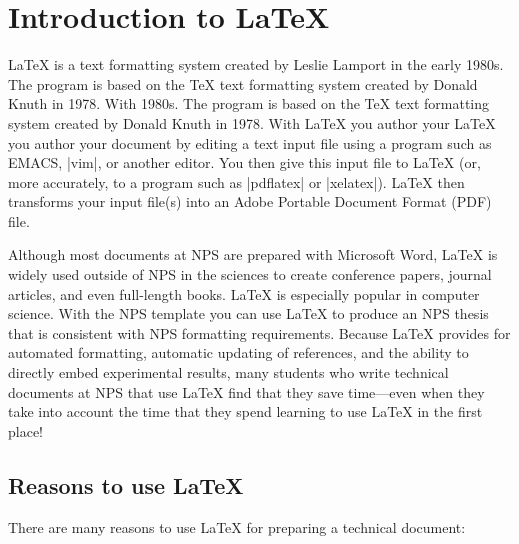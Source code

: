 \chapter{Introduction to \LaTeX}

\LaTeX{} is a text formatting system created by Leslie Lamport in the early
1980s\cite{latex}. The program is based on the \TeX{} text formatting system
created by Donald Knuth in 1978\cite{tex}. With 1980s\cite{latex}. The program
is based on the \TeX{} text formatting system created by Donald Knuth in
1978\cite{tex}. With \LaTeX{} you author your \LaTeX{} you author your document
by editing a text input file using a program such as EMACS, |vim|, or another
editor. You then give this input file to \LaTeX{} (or, more accurately, to a
program such as |pdflatex| or |xelatex|). \LaTeX{} then transforms your input
file(s) into an Adobe Portable Document Format (PDF) file.

Although most documents at NPS are prepared with Microsoft\textregistered{}
Word, \LaTeX{} is widely used outside of NPS in the sciences to create
conference papers, journal articles, and even full-length books. \LaTeX{} is
especially popular in computer science. With the NPS template you can use
\LaTeX{} to produce an NPS thesis that is consistent with NPS formatting
requirements. Because \LaTeX{} provides for automated formatting, automatic
updating of references, and the ability to directly embed experimental results,
many students who write technical documents at NPS that use \LaTeX{} find that
they save time---even when they take into account the time that they spend
learning to use \LaTeX{} in the first place!

\section{Reasons to use \LaTeX}

There are many reasons to use \LaTeX{} for preparing a technical document:

